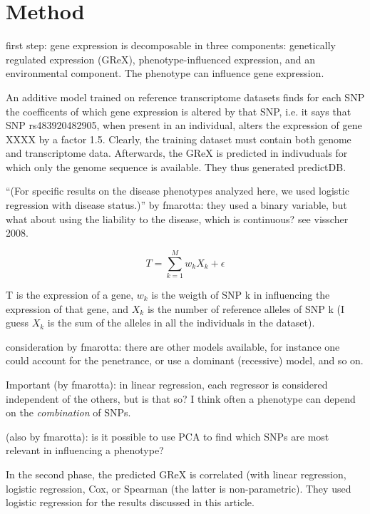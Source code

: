 \documentclass[../main.tex]{subfiles}
\begin{document}
\section{Method}

first step: gene expression is decomposable in three components: genetically
regulated expression (GReX), phenotype-influenced expression, and an
environmental component. The phenotype can influence gene expression.

An additive model trained on reference transcriptome datasets finds for each
SNP the coefficents of which gene expression is altered by that SNP, i.e. it
says that SNP rs483920482905, when present in an individual, alters the
expression of gene XXXX by a factor 1.5. Clearly, the training dataset must
contain both genome and transcriptome data. Afterwards, the GReX is predicted
in indivuduals for which only the genome sequence is available. They thus
generated predictDB.

\enquote{(For specific results on the disease phenotypes analyzed here, 
we used logistic regression with disease status.)} by fmarotta: they 
used a binary variable, but what about using the liability to the 
disease, which is continuous? see visscher 2008.

\begin{equation}
	T = \sum_{k=1}^{M}{w_k X_k + \epsilon}
\end{equation}

T is the expression of a gene, $w_k$ is the weigth of SNP k in influencing the
expression of that gene, and $X_k$ is the number of reference alleles of SNP k
(I guess $X_k$ is the sum of the alleles in all the individuals in the
dataset).

consideration by fmarotta: there are other models available, for instance one
could account for the penetrance, or use a dominant (recessive) model, and so
on.

Important (by fmarotta): in linear regression, each regressor is considered
independent of the others, but is that so? I think often a phenotype can depend
on the \textit{combination} of SNPs.

(also by fmarotta): is it possible to use PCA to find which SNPs are most
relevant in influencing a phenotype?

In the second phase, the predicted GReX is correlated (with linear regression,
logistic regression, Cox, or Spearman (the latter is non-parametric). They used
logistic regression for the results discussed in this article.
\end{document}
